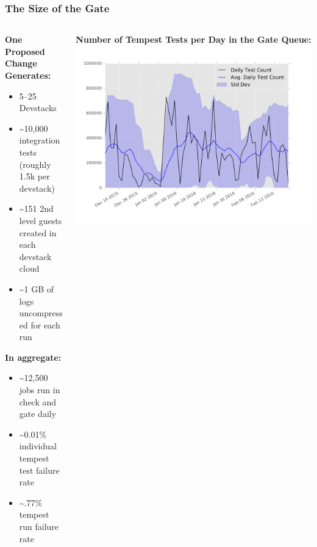 \documentclass[aspectratio=169,11pt,hyperref={colorlinks=true}]{beamer}
\begin{document}
\begin{frame}
\frametitle{The Size of the Gate}
    \begin{columns}[T]
        \begin{column}{.48\textwidth}
            \textbf{One Proposed Change Generates:}
			\begin{itemize}
				\item 5--25 Devstacks
				\item \textasciitilde10,000 integration tests (roughly 1.5k per devstack)
                \item \textasciitilde151 2nd level guests created in each devstack cloud
                \item \textasciitilde1 GB of logs uncompressed for each run
			\end{itemize}
            \textbf{In aggregate:}
            \begin{itemize}
                \item \textasciitilde12,500 jobs run in check and gate daily
                \item \textasciitilde0.01\% individual tempest test failure rate
                \item \textasciitilde.77\% tempest run failure rate
            \end{itemize}
        \end{column}
        \begin{column}{.48\textwidth}
            \centering
            \textbf{Number of Tempest Tests per Day in the Gate Queue:}
            \includegraphics[width=1.22\textwidth]{tempest-gate-count.png}
        \end{column}
    \end{columns}
\end{frame}
\end{document}
